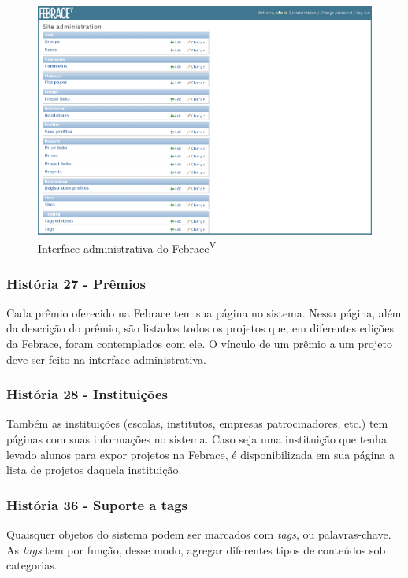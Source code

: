     \begin{figure}[h]
        \begin{center}
    \includegraphics[width=1.0\linewidth]{arquivos/admin.png}
        \end{center}
        \caption{Interface administrativa do Febrace\textsuperscript{V}}
        \label{admin}
    \end{figure}

    \subsubsection{História 27 - Prêmios}
      Cada prêmio oferecido na Febrace tem sua página no sistema. Nessa página, além da descrição do prêmio, são listados todos os projetos que, em diferentes edições da Febrace, foram contemplados com ele. O vínculo de um prêmio a um projeto deve ser feito na interface administrativa.

    \subsubsection{História 28 - Instituições}
      Também as instituições (escolas, institutos, empresas patrocinadores, etc.) tem páginas com suas informações no sistema. Caso seja uma instituição que tenha levado alunos para expor projetos na Febrace, é disponibilizada em sua página a lista de projetos daquela instituição.

    \subsubsection{História 36 - Suporte a tags}
      Quaisquer objetos do sistema podem ser marcados com \textit{tags}, ou palavras-chave. As \textit{tags} tem por função, desse modo, agregar diferentes tipos de conteúdos sob categorias.

